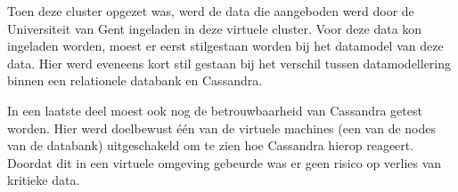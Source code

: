 Toen deze cluster opgezet was, werd de data die aangeboden werd door de Universiteit van Gent ingeladen in deze virtuele cluster.
Voor deze data kon ingeladen worden, moest er eerst stilgestaan worden bij het datamodel van deze data.
Hier werd eveneens kort stil gestaan bij het verschil tussen datamodellering binnen een relationele databank en Cassandra. 

In een laatste deel moest ook nog de betrouwbaarheid van Cassandra getest worden.
Hier werd doelbewust één van de virtuele machines (een van de nodes van de databank) uitgeschakeld om te zien hoe Cassandra hierop reageert.
Doordat dit in een virtuele omgeving gebeurde was er geen risico op verlies van kritieke data.